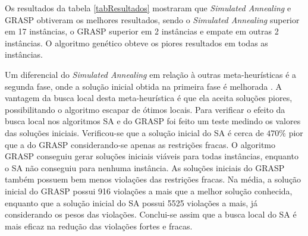 \documentclass[11pt]{article}
\begin{document}
Os resultados da tabela \ref{tabResultados} mostraram que \textit{Simulated Annealing} e GRASP obtiveram os melhores resultados, sendo o \textit{Simulated Annealing} superior em 17 instâncias, o GRASP superior em 2 instâncias e empate em outras 2 instâncias. O algoritmo genético obteve os piores resultados em todas as instâncias.

Um diferencial do \textit{Simulated Annealing} em relação à outras meta-heurísticas é a segunda fase, onde a solução inicial obtida na primeira fase é melhorada \cite{Kirkpatrick13051983}. A vantagem da busca local desta meta-heurística é que ela aceita soluções piores, possibilitando o algoritmo escapar de ótimos locais. Para verificar o efeito da busca local nos algoritmos SA e do GRASP foi feito um teste medindo os valores das soluções iniciais. Verificou-se que a solução inicial do SA é cerca de $470\%$ pior que a do GRASP considerando-se apenas as restrições fracas. O algoritmo GRASP conseguiu gerar soluções iniciais viáveis para todas instâncias, enquanto o SA não conseguiu para nenhuma instância. As soluções iniciais do GRASP também possuem bem menos violações das restrições fracas. Na média, a solução inicial do GRASP possui 916 violações a mais que a melhor solução conhecida, enquanto que a solução inicial do SA possui 5525 violações a mais, já considerando os pesos das violações. Conclui-se assim que a busca local do SA é mais eficaz na redução das violações fortes e fracas.



\end{document}
